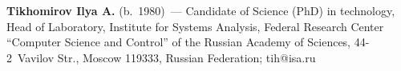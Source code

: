 \vspace*{3pt}

\noindent
\textbf{Tikhomirov Ilya A.} (b.\ 1980)~--- Candidate of Science (PhD) in 
technology, Head of Laboratory, Institute for Systems Analysis, Federal Research 
Center ``Computer Science and Control'' of the Russian Academy of Sciences, 
44-2~Vavilov Str., Moscow 119333, Russian Federation; \mbox{tih@isa.ru}

     
\label{end\stat}


\renewcommand{\bibname}{\protect\rm Литература} 